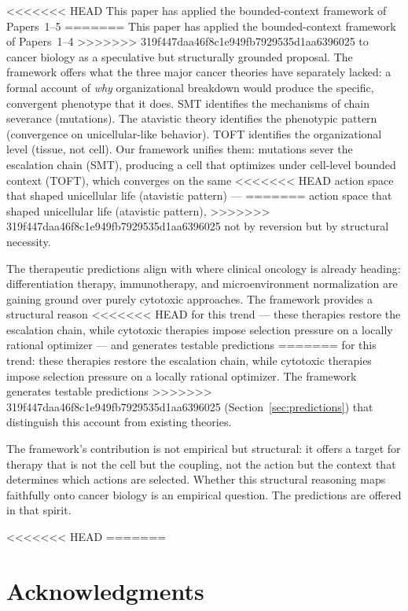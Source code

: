 \documentclass[11pt]{article}
\theoremstyle{definition}
\theoremstyle{remark}
\begin{document}
<<<<<<< HEAD
This paper has applied the bounded-context framework of Papers~1--5
=======
This paper has applied the bounded-context framework of Papers~1--4
>>>>>>> 319f447daa46f8c1e949fb7929535d1aa6396025
to cancer biology as a speculative but structurally grounded
proposal. The framework offers what the three major cancer theories
have separately lacked: a formal account of \emph{why} organizational
breakdown would produce the specific, convergent phenotype that it
does. SMT identifies the mechanisms of chain severance (mutations).
The atavistic theory identifies the phenotypic pattern (convergence
on unicellular-like behavior). TOFT identifies the organizational
level (tissue, not cell). Our framework unifies them: mutations
sever the escalation chain (SMT), producing a cell that optimizes
under cell-level bounded context (TOFT), which converges on the same
<<<<<<< HEAD
action space that shaped unicellular life (atavistic pattern) ---
=======
action space that shaped unicellular life (atavistic pattern),
>>>>>>> 319f447daa46f8c1e949fb7929535d1aa6396025
not by reversion but by structural necessity.

The therapeutic predictions align with where clinical oncology is
already heading: differentiation therapy, immunotherapy, and
microenvironment normalization are gaining ground over purely
cytotoxic approaches. The framework provides a structural reason
<<<<<<< HEAD
for this trend --- these therapies restore the escalation chain,
while cytotoxic therapies impose selection pressure on a locally
rational optimizer --- and generates testable predictions
=======
for this trend: these therapies restore the escalation chain,
while cytotoxic therapies impose selection pressure on a locally
rational optimizer. The framework generates testable predictions
>>>>>>> 319f447daa46f8c1e949fb7929535d1aa6396025
(Section~\ref{sec:predictions}) that distinguish this account from
existing theories.

The framework's contribution is not empirical but structural: it
offers a target for therapy that is not the cell but the coupling,
not the action but the context that determines which actions are
selected. Whether this structural reasoning maps faithfully onto
cancer biology is an empirical question. The predictions are offered
in that spirit.

<<<<<<< HEAD
=======
\section*{Acknowledgments}
\end{document}
